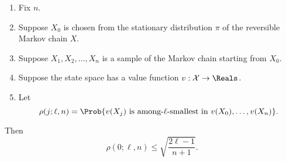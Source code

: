 \documentclass[12pt]{article}
\begin{document}
\begin{proposition}
    \label{thm:serialsignificance:basethm}
    \begin{enumerate}
        \item
            Fix \( n \).
        \item
            Suppose \( X_0 \) is chosen from the stationary
            distribution \( \pi \) of the reversible Markov chain \( X \).
        \item
            Suppose \( X_1, X_2, \dots, X_n \) is a sample of the Markov
            chain starting from \( X_0 \).
        \item
            Suppose the state space has a value function \( v : \mathcal
            {X} \to \Reals \).
        \item
            Let
            \[
                \rho(j; \ell, n) = \Prob{v(X_j) \text{ is among-\( \ell \)-smallest
                in } v(X_0), \dots, v(X_n) }.
            \]
    \end{enumerate}

    Then
    \[
        \rho(0; \ell, n) \le \sqrt{ \frac{2\ell - 1}{n+1}}.
    \]
\end{proposition}
\end{document}
